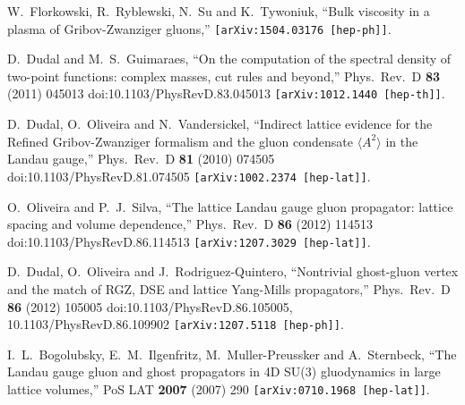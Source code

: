\documentclass[a4paper,11pt,british,twosides]{book}%
\numberwithin{equation}{section}
\begin{document}
\begin{thebibliography}{9}
  W.~Florkowski, R.~Ryblewski, N.~Su and K.~Tywoniuk,
  ``Bulk viscosity in a plasma of Gribov-Zwanziger gluons,''
  {\tt [arXiv:1504.03176 [hep-ph]]}.

  D.~Dudal and M.~S.~Guimaraes,
  ``On the computation of the spectral density of two-point functions: complex masses, cut
  rules and beyond,''
  Phys.\ Rev.\ D {\bf 83} (2011) 045013
  doi:10.1103/PhysRevD.83.045013
  {\tt [arXiv:1012.1440 [hep-th]]}.

  D.~Dudal, O.~Oliveira and N.~Vandersickel,
  ``Indirect lattice evidence for the Refined Gribov-Zwanziger formalism and the gluon
  condensate $\langle{A^2}\rangle$ in the Landau gauge,''
  Phys.\ Rev.\ D {\bf 81} (2010) 074505
  doi:10.1103/PhysRevD.81.074505
  {\tt [arXiv:1002.2374 [hep-lat]]}.

  O.~Oliveira and P.~J.~Silva,
  ``The lattice Landau gauge gluon propagator: lattice spacing and volume dependence,''
  Phys.\ Rev.\ D {\bf 86} (2012) 114513
  doi:10.1103/PhysRevD.86.114513
  {\tt [arXiv:1207.3029 [hep-lat]]}.

  D.~Dudal, O.~Oliveira and J.~Rodriguez-Quintero,
  ``Nontrivial ghost-gluon vertex and the match of RGZ, DSE and lattice Yang-Mills
  propagators,''
  Phys.\ Rev.\ D {\bf 86} (2012) 105005
  doi:10.1103/PhysRevD.86.105005, 10.1103/PhysRevD.86.109902
  {\tt [arXiv:1207.5118 [hep-ph]]}.

  I.~L.~Bogolubsky, E.~M.~Ilgenfritz, M.~Muller-Preussker and A.~Sternbeck,
  ``The Landau gauge gluon and ghost propagators in 4D SU(3) gluodynamics in large lattice
  volumes,''
  PoS LAT {\bf 2007} (2007) 290
  {\tt [arXiv:0710.1968 [hep-lat]]}.


\end{thebibliography}
\end{document}
